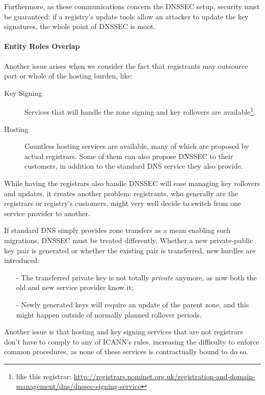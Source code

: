 \documentclass[a4paper,twocolumn]{scrartcl}
\begin{document}
Furthermore, as these communications concern the DNSSEC setup, security must be guaranteed: if a registry's update tools allow an attacker to update the key signatures, the whole point of DNSSEC is moot.

\paragraph*{Entity Roles Overlap} Another issue arises when we consider the fact that registrants may outsource part or whole of the hosting burden, like:

\begin{description}
\item[Key Signing] Services that will handle the zone signing and key rollovers are available\footnote{like this registrar: \url{http://registrars.nominet.org.uk/registration-and-domain-management/dns/dnssec-signing-service}}.
\item[Hosting] Countless hosting services are available, many of which are proposed by actual registrars. Some of them can also propose DNSSEC to their customers, in addition to the standard DNS service they also provide.
\end{description}

While having the registrars also handle DNSSEC will ease managing key rollovers and updates, it creates another problem: registrants, who generally are the registrars or registry's customers, might very well decide to switch from one service provider to another.

If standard DNS simply provides zone transfers as a mean enabling such migrations, DNSSEC must be treated differently. Whether a new private-public key pair is generated or whether the existing pair is transferred, new hurdles are introduced:

\begin{itemize}
\item[-] The transferred private key is not totally \emph{private} anymore, as now both the old and new service provider know it;
\item[-] Newly generated keys will require an update of the parent zone, and this might happen outside of normally planned rollover periods.
\end{itemize}

Another issue is that hosting and key signing services that are not registrars don't have to comply to any of ICANN's rules, increasing the difficulty to enforce common procedures, as none of these services is contractually bound to do so.
\end{document}
